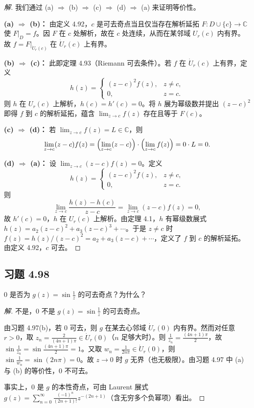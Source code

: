 \documentclass[11pt,a4paper]{article}
\newcommand{\C}{\mathbb{C}}
\theoremstyle{definition}
\newenvironment{solution}{\begin{proof}[解]}{\end{proof}}
\begin{document}
\begin{solution}
  我们通过 (a) $\Rightarrow$ (b) $\Rightarrow$ (c) $\Rightarrow$ (d) $\Rightarrow$ (a) 来证明等价性。

  \medskip
  \noindent\textbf{(a) $\Rightarrow$ (b)：}
  由定义 4.92，$c$ 是可去奇点当且仅当存在解析延拓 $F : D \cup \{c\} \to \C$ 使 $F|_D = f$。因 $F$ 在 $c$ 处解析，故在 $c$ 处连续，从而在某邻域 $U_r(c)$ 内有界。故 $f = F|_{\dot{U}_r(c)}$ 在 $\dot{U}_r(c)$ 上有界。

  \medskip
  \noindent\textbf{(b) $\Rightarrow$ (c)：}
  此即定理 4.93（Riemann 可去条件）。若 $f$ 在 $\dot{U}_r(c)$ 上有界，定义
  \[
    h(z) =
    \begin{cases}
      (z - c)^2 f(z), & z \ne c,\\
      0, & z = c.
    \end{cases}
  \]
  则 $h$ 在 $U_r(c)$ 上解析，$h(c) = h'(c) = 0$。将 $h$ 展为幂级数并提出 $(z-c)^2$ 即得 $f$ 到 $c$ 的解析延拓，蕴含 $\lim_{z \to c} f(z)$ 存在且等于 $F(c)$。

  \medskip
  \noindent\textbf{(c) $\Rightarrow$ (d)：}
  若 $\lim_{z \to c} f(z) = L \in \C$，则
  \[
    \lim_{z \to c} (z - c)f(z) = \Bigl(\lim_{z \to c} (z-c)\Bigr) \cdot
    \Bigl(\lim_{z \to c} f(z)\Bigr) = 0 \cdot L = 0.
  \]

  \medskip
  \noindent\textbf{(d) $\Rightarrow$ (a)：}
  设 $\lim_{z \to c} (z-c)f(z) = 0$。定义
  \[
    h(z) =
    \begin{cases}
      (z - c)^2 f(z), & z \ne c,\\
      0, & z = c.
    \end{cases}
  \]
  则
  \[
    \lim_{z \to c} \frac{h(z) - h(c)}{z - c} = \lim_{z \to c} (z-c)f(z) = 0,
  \]
  故 $h'(c) = 0$，$h$ 在 $U_r(c)$ 上解析。由定理 4.1，$h$ 有幂级数展式 $h(z) = a_2(z-c)^2 + a_3(z-c)^3 + \cdots$。于是 $z \ne c$ 时 $f(z) = h(z)/(z-c)^2 = a_2 + a_3(z-c) + \cdots$，定义了 $f$ 到 $c$ 的解析延拓。由定义 4.92，$c$ 可去。
\end{solution}

\subsection{习题 4.98}

$0$ 是否为 $g(z) = \sin \frac{1}{z}$ 的可去奇点？为什么？

\begin{solution}
  不是，$0$ 不是 $g(z) = \sin \frac{1}{z}$ 的可去奇点。

  由习题 4.97(b)，若 $0$ 可去，则 $g$ 在某去心邻域 $\dot{U}_r(0)$ 内有界。然而对任意 $r > 0$，取 $z_n = \frac{2}{(4n+1)\pi} \in \dot{U}_r(0)$（$n$ 足够大时）。则 $\frac{1}{z_n} = \frac{(4n+1)\pi}{2}$，故 $\sin\frac{1}{z_n} = \sin\frac{(4n+1)\pi}{2} = 1$。又取 $w_n = \frac{1}{2n\pi} \in \dot{U}_r(0)$，则 $\sin\frac{1}{w_n} = \sin(2n\pi) = 0$。故 $z \to 0$ 时 $g$ 无界（也无极限）。由习题 4.97 中 (a) 与 (b) 的等价性，$0$ 不可去。

  事实上，$0$ 是 $g$ 的本性奇点，可由 Laurent 展式 $g(z) = \sum_{n=0}^{\infty} \frac{(-1)^n}{(2n+1)!} z^{-(2n+1)}$（含无穷多个负幂项）看出。
\end{solution}
\end{document}
